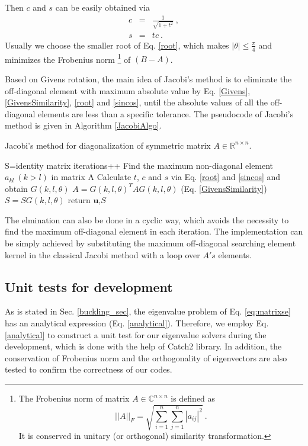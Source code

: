 \documentclass{article}
\begin{document}
Then $c$ and $s$ can be easily obtained via 
\begin{eqnarray}\label{sincos}
c&=&\frac{1}{\sqrt{1+t^2}}\ , \\ 
\nonumber
s&=&tc\ .
\end{eqnarray}
Usually we choose the smaller root of Eq. \ref{root}, which makes $|\theta|\leq\frac{\pi}{4}$ 
and minimizes the Frobenius norm
\footnote{The Frobenius norm of matrix $A\in \mathbb{C}^{n \times n}$ is defined as 
\begin{equation*}
||A||_{F} = \sqrt{\sum_{i=1}^{n}\sum_{j=1}^{n}|a_{ij}|^2}\ . 
\end{equation*}
It is conserved in unitary (or orthogonal) similarity transformation. }
of $(B-A)$. 
\par
Based on Givens rotation, the main idea of Jacobi's method is to eliminate the off-diagonal element with maximum absolute value  
by Eq. \ref{Givens}, \ref{GivensSimilarity}, \ref{root} and \ref{sincos}, 
until the absolute values of all the off-diagonal elements are less than a specific tolerance. 
The pseudocode of Jacobi's method is given in Algorithm \ref{JacobiAlgo}. 
\begin{algorithm}[tb]
	\label{JacobiAlgo}
	\caption{Jacobi's method for diagonalization of symmetric matrix $A\in \mathbb{R}^{n\times n}$. }
    S=identity matrix\; 
    {
    	iterations++\;
    	Find the maximum non-diagonal element $a_{kl}\ (k>l)$ in matrix A\; 
    	Calculate $t$, $c$ and $s$ via Eq. \ref{root} and \ref{sincos} and obtain $G(k,l,\theta)$\; 
	    $A=G(k,l,\theta)^{T}AG(k,l,\theta)$ (Eq. \ref{GivensSimilarity})\; 
	    $S=SG(k,l,\theta)$\;
    }
	return $\mathbf{u}$,$S$\;
\end{algorithm}
The elmination can also be done in a cyclic way, which avoids the necessity to find the maximum off-diagonal element in each iteration. The implementation can be simply achieved by substituting the maximum off-diagonal searching element kernel in the classical Jacobi method with a loop over $A's$ elements.


 
	
	\subsection{Unit tests for development}\label{unittests}
As is stated in Sec. \ref{buckling_sec}, the eigenvalue problem of Eq. \ref{eq:matrixse} 
has an analytical expression (Eq. \ref{analytical}). 
Therefore, we employ Eq. \ref{analytical} to construct a unit test for our eigenvalue solvers during the development, 
which is done with the help of Catch2 library. 
In addition, the conservation of Frobenius norm and the orthogonality of eigenvectors are also tested 
to confirm the correctness of our codes. 
	
\end{document}
